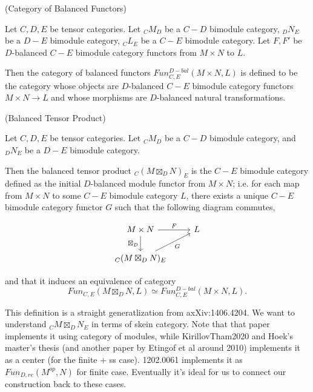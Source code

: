 \begin{definition} (Category of Balanced Functors)

  \noindent Let $C, D, E$ be tensor categories. Let $_{C}M_{D}$ be a $C-D$
  bimodule category, $_{D}N_{E}$ be a $D-E$ bimodule category, $_{C}L_{E}$ be
  a $C-E$ bimodule category. Let $F, F'$ be $D$-balanced $C-E$ bimodule
  category functors from $M \times N$ to $L$.

  \noindent Then the category of balanced functors
  $Fun^{D-bal}_{C,E}(M \times N, L)$ is defined to be the category whose
  objects are $D$-balanced $C-E$ bimodule category functors $M \times N \to L$
  and whose morphisms are $D$-balanced natural transformations.
\end{definition}

\begin{definition} (Balanced Tensor Product)

  \noindent Let $C, D, E$ be tensor categories. Let $_{C}M_{D}$ be a $C-D$
  bimodule category, and $_{D}N_{E}$ be a $D-E$ bimodule category.

  \noindent Then the balanced tensor product $_{C}(M \boxtimes_{D} N)_{E}$ is
  the $C-E$ bimodule category defined as the initial $D$-balanced module
  functor from $M \times N$; i.e. for each map from $M \times N$ to some $C-E$
  bimodule category $L$, there exists a unique $C-E$ bimodule category functor
  $G$ such that the following diagram commutes,

  \[
    \begin{tikzcd}
      M \times N \arrow[r, "F"] \arrow[d, "\boxtimes_{D}"'] & L \\
      _{C}(M \boxtimes_{D} N)_{E} \arrow[ur, "G"']
    \end{tikzcd}
  \]

  \noindent and that it induces an equivalence of category
  \[Fun_{C,E}(M \boxtimes_{D} N, L) \simeq Fun_{C,E}^{D-bal}(M \times N, L).\]
\end{definition}

\begin{remark}
  This definition is a straight generatlization from axXiv:1406.4204. We want
  to understand $_{C}M \boxtimes_{D} N_{E}$ in terms of skein category. Note
  that that paper implements it using category of modules, while
  KirillovTham2020 and Hoek's master's thesis (and another paper by Etingof et
  al around 2010) implements it as a center (for the finite + ss case).
  1202.0061 implements it as $Fun_{D,re}(M^{op},N)$ for finite case.
  Eventually it's ideal for us to connect our construction back to these
  cases.
\end{remark}

